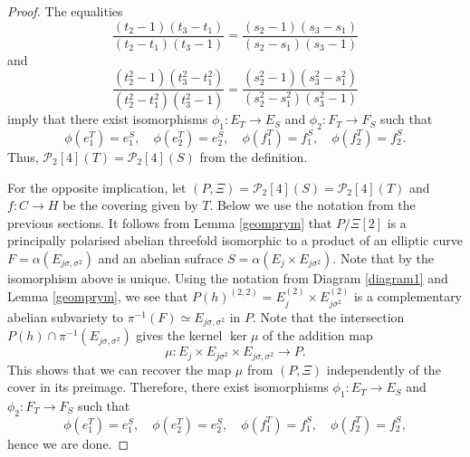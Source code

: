 \documentclass{article}
\numberwithin{equation}{section}
\newcommand{\s}{\sigma}
\DeclareMathOperator{\im}{Im}
\begin{document}
\begin{proof}
    The equalities $$\frac{(t_2 - 1)(t_3 - t_1)}{(t_2 - t_1)(t_3 - 1)} =  \frac{(s_2 - 1)(s_3 - s_1)}{(s_2 - s_1)(s_3 - 1)}$$ and $$
        \frac{(t_2^2 - 1)(t_3^2 - t_1^2)}{(t_2^2 - t_1^2)(t_3^2 - 1)} = \frac{(s_2^2 - 1)(s_3^2 - s_1^2)}{(s_2^2 - s_1^2)(s_3^2 - 1)}$$ imply that there exist isomorphisms $\phi_1: E_{T} \to E_S$ and $\phi_2: F_T \to F_S$ such that $$\phi(e_1^T) = e_1^S, \quad \phi(e_2^T) = e_2^S, \quad \phi(f_1^T) = f_1^S, \quad \phi(f_2^T) = f_2^S.$$ Thus, $\mathcal{P}_2[4](T) = \mathcal{P}_2[4](S)$ from the definition.

        For the opposite implication, let $(P, \Xi) = \mathcal{P}_2[4](S) = \mathcal{P}_2[4](T)$ and 
        $f: C \to H$ be the covering given by $T$. Below we use the notation from the previous sections. It follows from Lemma \ref{geomprym} that $P/\Xi[2]$ is a principally polarised abelian threefold isomorphic to a product of an elliptic curve $F = \alpha(E_{j\s, \s^2})$ and an abelian sufrace $S = \alpha(E_j \times E_{j\s^2})$. Note that by \cite[Decomposition theorem 4.3.1]{BL} the isomorphism above is unique. Using the notation from Diagram \ref{diagram1} and Lemma \ref{geomprym}, we see that $P(h)^{(2,2)} = E_j^{(2)} \times E_{j\s^2}^{(2)}$ is a complementary abelian subvariety to $\pi^{-1}(F) \simeq E_{j\s, \s^2}$ in $P$. Note that the intersection $P(h) \cap \pi^{-1}(E_{j\s, \s^2})$ gives the kernel $\ker \mu$ of the addition map $$ \mu: E_j \times E_{j\s^2} \times E_{j\s, \s^2} \to P.$$ This shows that we can recover the map $\mu$ from $(P, \Xi)$ independently of the cover in its preimage. Therefore, there exist isomorphisms $\phi_1: E_T \to E_S$ and $\phi_2: F_T \to F_S$ such that $$\phi(e_1^T) = e_1^S, \quad \phi(e_2^T) = e_2^S, \quad \phi(f_1^T) = f_1^S, \quad \phi(f_2^T) = f_2^S,$$ hence we are done.
        
\end{proof}



\end{document}
